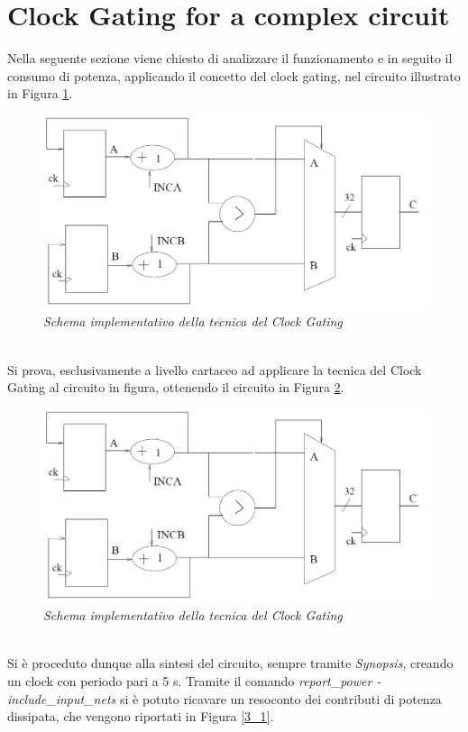 \section{Clock Gating for a complex circuit}
Nella seguente sezione viene chiesto di analizzare il funzionamento e in seguito il consumo di potenza, applicando il concetto del clock gating, nel circuito illustrato in Figura \ref{circuito_3_2}.\\
\begin{figure}[!htb]
	\centering
	\includegraphics[scale=0.8]{immagini/circuito_3_2}
	\caption{\textit{Schema implementativo della tecnica del Clock Gating}}
	\label{circuito_3_2}
\end{figure}
\\
Si prova, esclusivamente a livello cartaceo ad applicare la tecnica del Clock Gating al circuito in figura, ottenendo il circuito in Figura \ref{circuito_3_3}.\\
\begin{figure}[!htb]
	\centering
	\includegraphics[scale=0.8]{immagini/circuito_3_2}
	\caption{\textit{Schema implementativo della tecnica del Clock Gating}}
	\label{circuito_3_3}
\end{figure}
\\
Si è proceduto dunque alla sintesi del circuito, sempre tramite \textit{Synopsis}, creando un clock con periodo pari a 5 s. Tramite il comando \textit{report\_power -include\_input\_nets} si è potuto ricavare un resoconto dei contributi di potenza dissipata, che vengono riportati in Figura \ref{3_1}. \\
